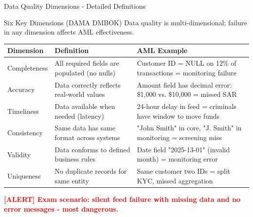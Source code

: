 \documentclass[11pt,a4paper]{beamer}
\newcommand{\redflag}[1]{\textcolor{red}{\textbf{[ALERT] #1}}}
\begin{document}
\begin{frame}{Data Quality Dimensions - Detailed Definitions}
	\begin{block}{Six Key Dimensions (DAMA DMBOK)}
		Data quality is multi-dimensional; failure in any dimension affects AML effectiveness.
	\end{block}
	\begin{longtable}{p{}|p{}|p{}}
		\hline
		\rowcolor{lightgray}
		\textbf{Dimension} & \textbf{Definition} & \textbf{AML Example} \\
		\hline
		Completeness & All required fields are populated (no nulls) & Customer ID = NULL on 12\% of transactions = monitoring failure \\
		\hline
		Accuracy & Data correctly reflects real-world values & Amount field has decimal error: \$1,000 vs. \$10,000 = missed SAR \\
		\hline
		Timeliness & Data available when needed (latency) & 24-hour delay in feed = criminals have window to move funds \\
		\hline
		Consistency & Same data has same format across systems & "John Smith" in core, "J. Smith" in monitoring = screening miss \\
		\hline
		Validity & Data conforms to defined business rules & Date field "2025-13-01" (invalid month) = monitoring error \\
		\hline
		Uniqueness & No duplicate records for same entity & Same customer two IDs = split KYC, missed aggregation \\
		\hline
	\end{longtable}
	\redflag{Exam scenario: silent feed failure with missing data and no error messages - most dangerous.}
\end{frame}
\end{document}
